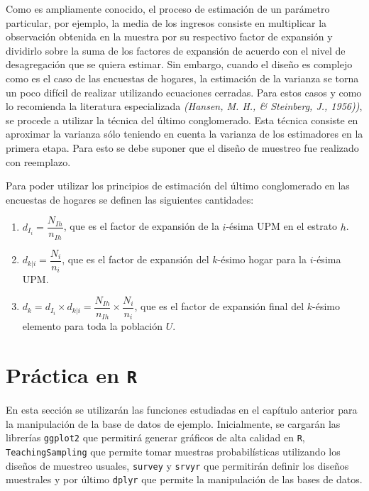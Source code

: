 \documentclass[
  12pt,
]{book}
\begin{document}
Como es ampliamente conocido, el proceso de estimación de un parámetro particular, por ejemplo, la media de los ingresos consiste en multiplicar la observación obtenida en la muestra por su respectivo factor de expansión y dividirlo sobre la suma de los factores de expansión de acuerdo con el nivel de desagregación que se quiera estimar. Sin embargo, cuando el diseño es complejo como es el caso de las encuestas de hogares, la estimación de la varianza se torna un poco difícil de realizar utilizando ecuaciones cerradas. Para estos casos y como lo recomienda la literatura especializada \emph{(Hansen, M. H., \& Steinberg, J., 1956))}, se procede a utilizar la técnica del último conglomerado. Esta técnica consiste en aproximar la varianza sólo teniendo en cuenta la varianza de los
estimadores en la primera etapa. Para esto se debe suponer que el diseño de muestreo fue realizado con reemplazo.

Para poder utilizar los principios de estimación del último conglomerado en las encuestas de hogares se definen las siguientes cantidades:

\begin{enumerate}
\def\labelenumi{\arabic{enumi}.}
\item
  \(d_{I_i} = \dfrac{N_{Ih}}{n_{Ih}}\), que es el factor de expansión de la \(i\)-ésima UPM en el estrato \(h\).
\item
  \(d_{k|i} = \dfrac{N_{i}}{n_{i}}\), que es el factor de expansión del \(k\)-ésimo hogar para la \(i\)-ésima UPM.
\item
  \(d_k = d_{I_i} \times d_{k|i} = \dfrac{N_{Ih}}{n_{Ih}} \times \dfrac{N_{i}}{n_{i}}\), que es el factor de expansión final del \(k\)-ésimo elemento para toda la población \(U\).
\end{enumerate}

\section{\texorpdfstring{Práctica en \texttt{R}}{Práctica en R}}\label{pruxe1ctica-en-r}

En esta sección se utilizarán las funciones estudiadas en el capítulo anterior para la manipulación de la base de datos de ejemplo. Inicialmente, se cargarán las librerías \texttt{ggplot2} que permitirá generar gráficos de alta calidad en \texttt{R}, \texttt{TeachingSampling} que permite tomar muestras probabilísticas utilizando los diseños de muestreo usuales, \texttt{survey} y \texttt{srvyr} que permitirán definir los diseños muestrales y por último \texttt{dplyr} que permite la manipulación de las bases de datos.
\end{document}
